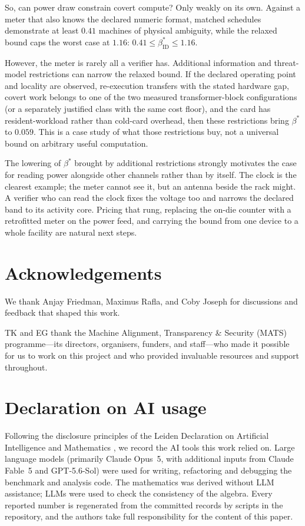 \documentclass{article}
\theoremstyle{plain}
\theoremstyle{definition}
\theoremstyle{remark}
\begin{document}
So, can power draw constrain covert compute? Only weakly on its
own. Against a meter that also knows the declared numeric format, matched
schedules demonstrate at least $0.41$ machines of physical ambiguity, while
the relaxed bound caps the worst case at $1.16$:
$0.41 \leq \beta_{\mathrm{ID}}^{*} \leq 1.16$.

However, the meter is rarely all a verifier has. Additional information and threat-model restrictions can narrow the relaxed
bound. If the declared operating point and locality are observed, re-execution transfers
with the stated hardware gap, covert work belongs to one of the two measured
transformer-block configurations (or a separately justified class with the
same cost floor), and the card has resident-workload rather than cold-card
overhead, then these restrictions bring $\beta^{*}$ to $0.059$. This is a case study of what those restrictions buy, not a universal
bound on arbitrary useful computation.

The lowering of $\beta^{*}$ brought by additional restrictions strongly motivates the case for reading power alongside other channels rather than by itself. The clock is the clearest example; the meter cannot see it, but an
antenna beside the rack might. A verifier who can read the clock fixes the voltage
too and narrows the declared band to its activity core. Pricing that rung,
replacing the on-die counter with a retrofitted meter on the power feed, and
carrying the bound from one device to a whole facility are natural next steps.

\ifdefined\anonymous\else
\section*{Acknowledgements}

We thank Anjay Friedman, Maximus Rafla, and Coby Joseph for
discussions and feedback that shaped this work.

TK and EG thank the Machine Alignment, Transparency \& Security (MATS) programme---its
directors, organisers, funders, and staff---who made it possible for us to
work on this project and who provided invaluable resources and support
throughout.
\fi

\section*{Declaration on AI usage}
Following the disclosure principles of the Leiden Declaration on Artificial
Intelligence and Mathematics \citep{alper2026leiden}, we record the AI tools
this work relied on. Large language models (primarily Claude Opus~5, with additional inputs from Claude Fable~5 and
GPT-5.6-Sol) were used for writing,
refactoring and debugging the benchmark and analysis code. The mathematics was derived without LLM assistance; LLMs were used to check the consistency of the algebra. Every reported number is regenerated from the committed records by scripts in the repository, and the authors take full
responsibility for the content of this paper.
\end{document}
